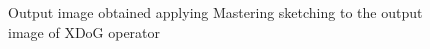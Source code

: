 \begin{figure}[htbp]
    \centering
     \quad
    \caption{Output image obtained applying Mastering sketching to the output image of XDoG operator}
    \label{fig:xdogSimplifyRes}
\end{figure}